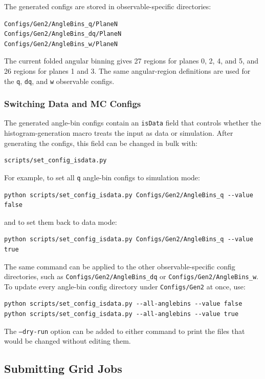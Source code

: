 \documentclass{article}
\begin{document}
The generated configs are stored in observable-specific directories:
\begin{verbatim}
Configs/Gen2/AngleBins_q/PlaneN
Configs/Gen2/AngleBins_dq/PlaneN
Configs/Gen2/AngleBins_w/PlaneN
\end{verbatim}
The current folded angular binning gives 27 regions for planes 0, 2, 4, and 5, and 26 regions for planes 1 and 3. The same angular-region definitions are used for the \texttt{q}, \texttt{dq}, and \texttt{w} observable configs.

\subsubsection{Switching Data and MC Configs}

The generated angle-bin configs contain an \texttt{isData} field that controls whether the histogram-generation macro treats the input as data or simulation. After generating the configs, this field can be changed in bulk with:
\begin{verbatim}
scripts/set_config_isdata.py
\end{verbatim}

For example, to set all \texttt{q} angle-bin configs to simulation mode:
\begin{verbatim}
python scripts/set_config_isdata.py Configs/Gen2/AngleBins_q --value false
\end{verbatim}
and to set them back to data mode:
\begin{verbatim}
python scripts/set_config_isdata.py Configs/Gen2/AngleBins_q --value true
\end{verbatim}

The same command can be applied to the other observable-specific config directories, such as \texttt{Configs/Gen2/AngleBins\_dq} or \texttt{Configs/Gen2/AngleBins\_w}. To update every angle-bin config directory under \texttt{Configs/Gen2} at once, use:
\begin{verbatim}
python scripts/set_config_isdata.py --all-anglebins --value false
python scripts/set_config_isdata.py --all-anglebins --value true
\end{verbatim}
The \texttt{--dry-run} option can be added to either command to print the files that would be changed without editing them.

\subsection{Submitting Grid Jobs}
\end{document}
